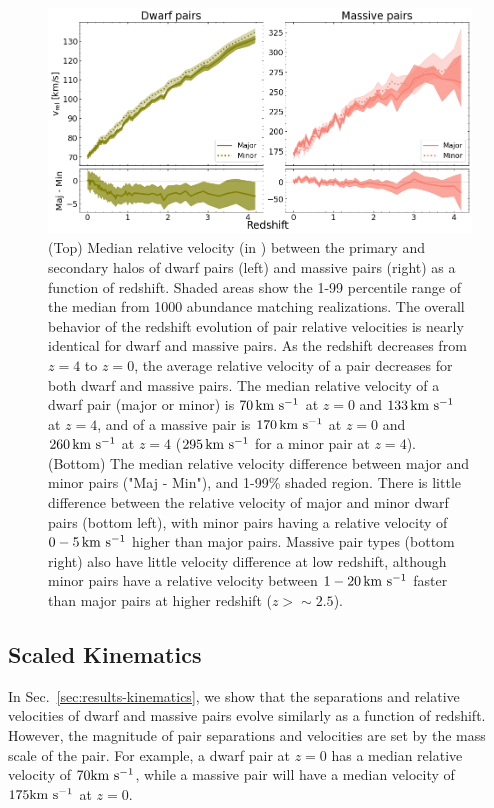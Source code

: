 \documentclass[twocolumn]{aastex631}
\begin{document}
    \begin{figure}[htp]
      \centering
      \includegraphics[width=\textwidth]{vel_1000.png}
      \caption{
        (Top) Median relative velocity (in \kms) between the primary and secondary halos of dwarf pairs (left) and massive pairs (right) as a function of redshift. 
        Shaded areas show the 1-99 percentile range of the median from 1000 abundance matching realizations. 
        The overall behavior of the redshift evolution of pair relative velocities is nearly identical for dwarf and massive pairs.
        As the redshift decreases from $z=4$ to $z=0$, the average relative velocity of a pair decreases for both dwarf and massive pairs.
        The median relative velocity of a dwarf pair (major or minor) is $70\,\mathrm{km}~\mathrm{s}^{-1}$ at $z=0$ and $133\,\mathrm{km}~\mathrm{s}^{-1}$ at $z=4$, and of a massive pair is $170\,\mathrm{km}~\mathrm{s}^{-1}$ at $z=0$ and $260\,\mathrm{km}~\mathrm{s}^{-1}$ at $z=4$ ($295\,\mathrm{km}~\mathrm{s}^{-1}$ for a minor pair at $z=4$). 
        (Bottom) The median relative velocity difference between major and minor pairs ("Maj - Min"), and 1-99\% shaded region.
        There is little difference between the relative velocity of major and minor dwarf pairs (bottom left), with minor pairs having a relative velocity of $0-5\,\mathrm{km}~\mathrm{s}^{-1}$ higher than major pairs. 
        Massive pair types (bottom right) also have little velocity difference at low redshift, although minor pairs have a relative velocity between $1-20\,\mathrm{km}~\mathrm{s}^{-1}$ faster than major pairs at higher redshift ($z>\sim 2.5$).
        }
      \label{fig:vel}
    \end{figure}

    \subsection{Scaled Kinematics}\label{sec:results-scaled}
    In Sec.~\ref{sec:results-kinematics}, we show that the separations and relative velocities of dwarf and massive pairs evolve similarly as a function of redshift. 
    However, the magnitude of pair separations and velocities are set by the mass scale of the pair. 
    For example, a dwarf pair at $z=0$ has a median relative velocity of $70\mathrm{km}~\mathrm{s}^{-1}$, while a massive pair will have a median velocity of $175\mathrm{km}~\mathrm{s}^{-1}$ at $z=0$.
    
\end{document}
